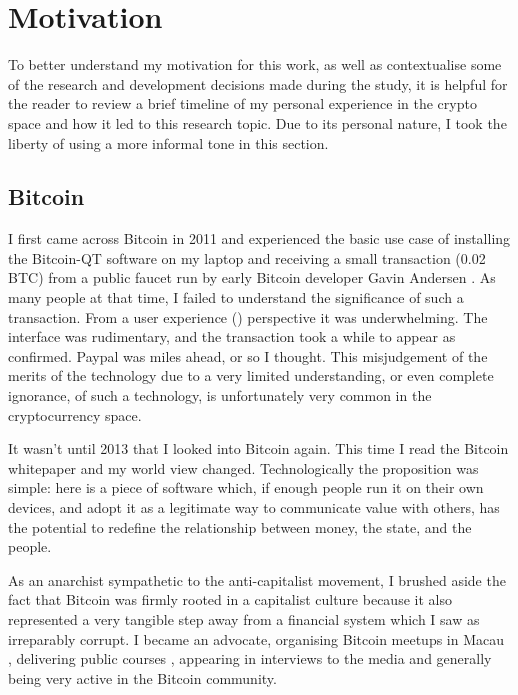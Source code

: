 \section{Motivation}

To better understand my motivation for this work, as well as contextualise some of the research and development decisions made during the study, it is helpful for the reader to review a brief timeline of my personal experience in the crypto space and how it led to this research topic. Due to its personal nature, I took the liberty of using a more informal tone in this section.

\subsection*{Bitcoin}

I first came across Bitcoin in 2011 and experienced the basic use case of installing the Bitcoin-QT software on my laptop and receiving a small transaction (0.02 BTC) from a public faucet run by early Bitcoin developer Gavin Andersen \cite{lucasHowGavinAndresen2022}. As many people at that time, I failed to understand the significance of such a transaction. From a user experience () perspective it was underwhelming.  The interface was rudimentary, and the transaction took a while to appear as confirmed. Paypal was miles ahead, or so I thought. This misjudgement of the merits of the technology due to a very limited understanding, or even complete ignorance, of such a technology, is unfortunately very common in the cryptocurrency space.

It wasn't until 2013 that I looked into Bitcoin again. This time I read the Bitcoin whitepaper \cite{nakamotoBitcoinPeertopeerElectronic2008} and my world view changed. Technologically the proposition was simple: here is a piece of software which, if enough people run it on their own devices, and adopt it as a legitimate way to communicate value with others, has the potential to redefine the relationship between money, the state, and the people.

As an anarchist sympathetic to the anti-capitalist movement, I brushed aside the fact that Bitcoin was firmly rooted in a capitalist culture because it also represented a very tangible step away from a financial system which I saw as irreparably corrupt. I became an advocate, organising Bitcoin meetups in Macau \cite{BitcoinMacau2024}, delivering public courses \cite{mouraUSJHoldCourse2021}, appearing in interviews to the media \cite{tdmportuguesenewsprogramsReportagemJornalistaLina2015} \cite{reisBitcoinDuasFaces2017} and generally being very active in the Bitcoin community.

